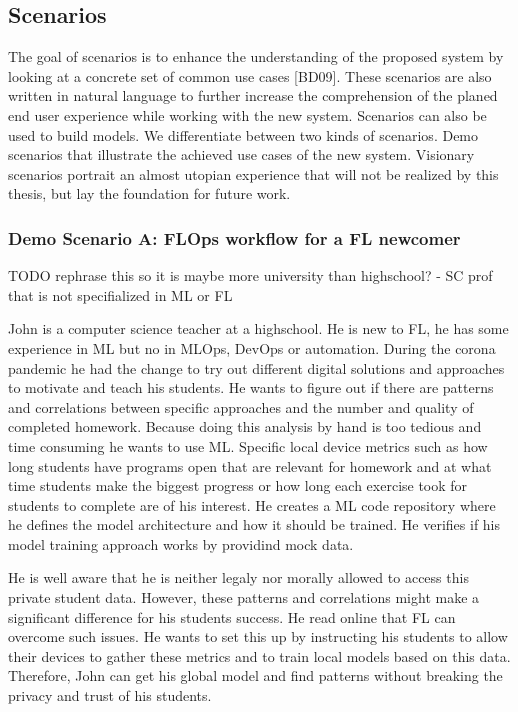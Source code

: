 \subsection{Scenarios}

The goal of scenarios is to enhance the understanding of the proposed system by looking at a concrete set of common use cases [BD09].
These scenarios are also written in natural language to further increase the comprehension of the planed end user experience while working with the new system.
Scenarios can also be used to build models. We differentiate between two kinds of scenarios.
Demo scenarios that illustrate the achieved use cases of the new system.
Visionary scenarios portrait an almost utopian experience that will not be realized by this thesis, but lay the foundation for future work.



\subsubsection{Demo Scenario A: FLOps workflow for a FL newcomer}

TODO rephrase this so it is maybe more university than highschool? - SC prof that is not specifialized in ML or FL

John is a computer science teacher at a highschool.
He is new to FL, he has some experience in ML but no in MLOps, DevOps or automation.
During the corona pandemic he had the change to try out different digital solutions and approaches to motivate and teach his students.
He wants to figure out if there are patterns and correlations between specific approaches and the number and quality of completed homework.
Because doing this analysis by hand is too tedious and time consuming he wants to use ML.
Specific local device metrics such as how long students have programs open that are relevant for homework and at what time students make the biggest progress
or how long each exercise took for students to complete are of his interest.
He creates a ML code repository where he defines the model architecture and how it should be trained.
He verifies if his model training approach works by providind mock data.

He is well aware that he is neither legaly nor morally allowed to access this private student data.
However, these patterns and correlations might make a significant difference for his students success.
He read online that FL can overcome such issues.
He wants to set this up by instructing his students to allow their devices to gather these metrics and to train local models based on this data.
Therefore, John can get his global model and find patterns without breaking the privacy and trust of his students.

